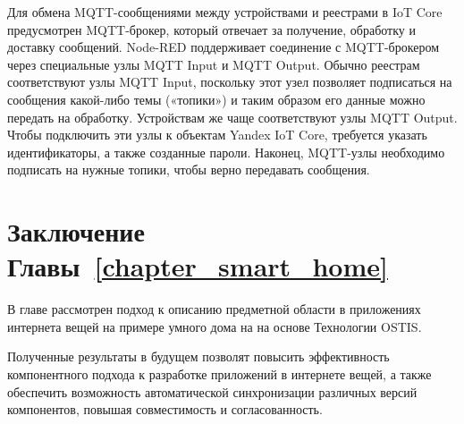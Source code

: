 Для обмена MQTT-сообщениями между устройствами и реестрами в IoT Core предусмотрен MQTT-брокер, который отвечает за получение, обработку и доставку сообщений. Node-RED поддерживает соединение с MQTT-брокером через специальные узлы MQTT Input и MQTT Output. Обычно реестрам соответствуют узлы MQTT Input, поскольку этот узел позволяет подписаться на сообщения какой-либо темы («топики») и таким образом его данные можно передать на обработку. Устройствам же чаще соответствуют узлы MQTT Output. Чтобы подключить эти узлы к объектам Yandex IoT Core, требуется указать идентификаторы, а также созданные пароли. Наконец, MQTT-узлы необходимо подписать на нужные топики, чтобы верно передавать сообщения.

\section*{Заключение Главы~\ref{chapter_smart_home}}
\label{sec_SH_plans_and_tasks}

В главе рассмотрен подход к описанию предметной области в приложениях интернета вещей на примере умного дома на на основе Технологии OSTIS.

Полученные результаты в будущем позволят повысить эффективность компонентного подхода к разработке приложений в интернете вещей, а также обеспечить возможность автоматической синхронизации различных версий компонентов, повышая совместимость и согласованность.
